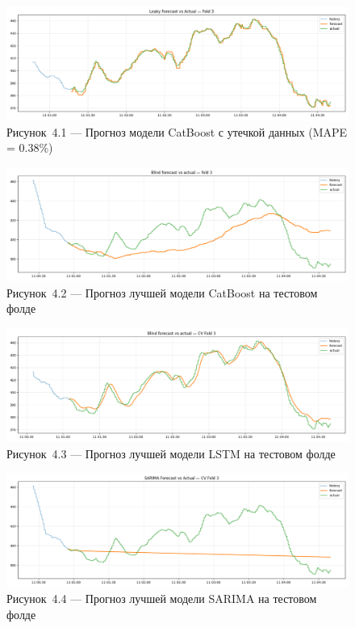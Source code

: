 \begin{figure}[H]
	\centering
	\includegraphics[width=\textwidth]{figures/chapter4/catboost_leakage_forecast.png}
	\caption*{Рисунок~4.1 — Прогноз модели CatBoost с утечкой данных (MAPE = 0.38\%)}
	\label{fig:catboost_leakage_forecast}
\end{figure}

\begin{figure}[H]
	\centering
	\includegraphics[width=\textwidth]{figures/chapter4/catboost_forecast.png}
	\caption*{Рисунок~4.2 — Прогноз лучшей модели CatBoost на тестовом фолде}
	\label{fig:catboost_forecast}
\end{figure}

\begin{figure}[H]
	\centering
	\includegraphics[width=\textwidth]{figures/chapter4/lstm_forecast.png}
	\caption*{Рисунок~4.3 — Прогноз лучшей модели LSTM на тестовом фолде}
	\label{fig:lstm_forecast}
\end{figure}

\begin{figure}[H]
	\centering
	\includegraphics[width=\textwidth]{figures/chapter4/sarima_forecast.png}
	\caption*{Рисунок~4.4 — Прогноз лучшей модели SARIMA на тестовом фолде}
	\label{fig:sarima_forecast}
\end{figure}

